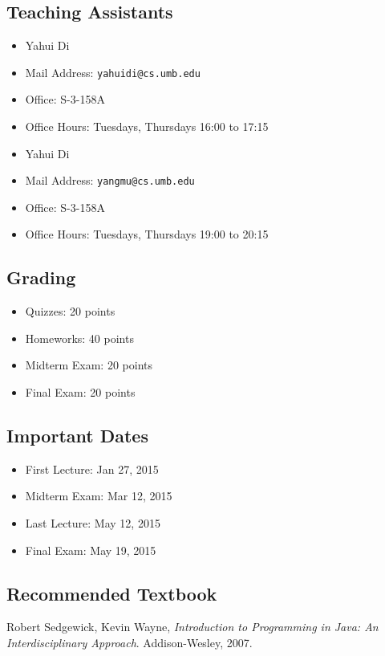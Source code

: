\documentclass[12pt,letterpaper,twoside]{article}
\begin{document}
\subsection*{Teaching Assistants}
\begin{itemize}
\item[] Yahui Di
\item[] Mail Address: \texttt{yahuidi@cs.umb.edu}
\item[] Office: S-3-158A
\item[] Office Hours: Tuesdays, Thursdays 16:00 to 17:15
\end{itemize}
\begin{itemize}
\item[] Yahui Di
\item[] Mail Address: \texttt{yangmu@cs.umb.edu}
\item[] Office: S-3-158A
\item[] Office Hours: Tuesdays, Thursdays 19:00 to 20:15
\end{itemize}

\subsection*{Grading}
\begin{itemize}
\item[] Quizzes: 20 points
\item[] Homeworks: 40 points
\item[] Midterm Exam: 20 points
\item[] Final Exam: 20 points
\end{itemize}

\subsection*{Important Dates}
\begin{itemize}
\item[] First Lecture: Jan 27, 2015
\item[] Midterm Exam: Mar 12, 2015
\item[] Last Lecture: May 12, 2015
\item[] Final Exam: May 19, 2015
\end{itemize}

\subsection*{Recommended Textbook}
Robert Sedgewick, Kevin Wayne, \textit{Introduction to Programming in Java: An Interdisciplinary Approach}. Addison-Wesley, 2007.
\end{document}
